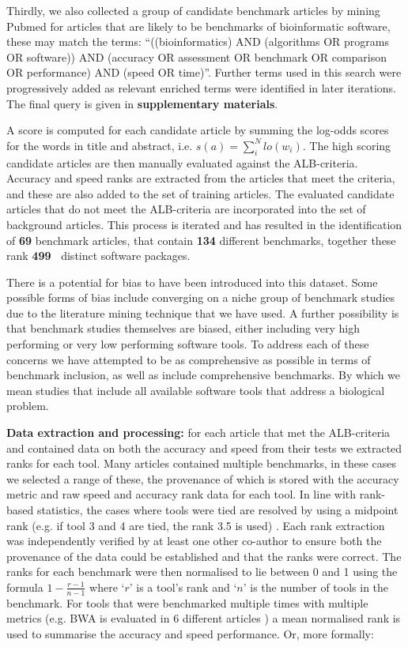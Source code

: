 \documentclass[fleqn,10pt]{SelfArx} %
\def\numTools{499}
\def\numBenchmarkPubs{69}
\def\numBenchmarks{134}
\begin{document}
Thirdly, we also collected a group of candidate benchmark articles by
mining Pubmed for articles that are likely to be benchmarks of
bioinformatic software, these may match the terms: “((bioinformatics)
AND (algorithms OR programs OR software)) AND (accuracy OR assessment
OR benchmark OR comparison OR performance) AND (speed OR
time)”. Further terms used in this search were progressively added as
relevant enriched terms were identified in later iterations. The final
query is given in \textbf{supplementary materials}.

A score is computed for each candidate article by summing the log-odds
scores for the words in title and abstract,
i.e. $s(a)=\sum_i^Nlo(w_i)$. The high scoring candidate articles are
then manually evaluated against the ALB-criteria. Accuracy and speed
ranks are extracted from the articles that meet the criteria, and
these are also added to the set of training articles. The evaluated
candidate articles that do not meet the ALB-criteria are incorporated
into the set of background articles. This process is iterated and has resulted in the identification of
\textbf{{\color{red}\numBenchmarkPubs}} benchmark articles, that
contain \textbf{{\color{red}\numBenchmarks}} different benchmarks, together these
rank \textbf{{\color{red}\numTools~}} distinct software packages.

There is a potential for bias to have been introduced into this
dataset. Some possible forms of bias include converging on a niche
group of benchmark studies due to the literature mining technique that
we have used. A further possibility is that benchmark studies
themselves are biased, either including very high performing or very
low performing software tools. To address each of these concerns we
have attempted to be as comprehensive as possible in terms of
benchmark inclusion, as well as include comprehensive benchmarks. By
which we mean studies that include all available software tools that
address a biological problem.

\textbf{Data extraction and processing:} for each article that met the
ALB-criteria and contained data on both the accuracy and speed from
their tests we extracted ranks for each tool. Many articles contained
multiple benchmarks, in these cases we selected a range of these, the
provenance of which is stored with the accuracy metric and raw speed
and accuracy rank data for each tool. In line with rank-based
statistics, the cases where tools were tied are resolved by using a
midpoint rank (e.g. if tool 3 and 4 are tied, the rank 3.5 is used)
\cite{Mann1947-re}. Each rank extraction was independently verified by
at least one other co-author to ensure both the provenance of the data
could be established and that the ranks were correct. The ranks for
each benchmark were then normalised to lie between 0 and 1 using the
formula $1-\frac{r-1}{n-1}$ where ‘$r$’ is a tool’s rank and ‘$n$’ is the
number of tools in the benchmark. For tools that were benchmarked
multiple times with multiple metrics (e.g. BWA is evaluated in 6
different articles
\cite{Bao2011-lv,Caboche2014-lj,Hatem2013-cs,Schbath2012-ob,Ruffalo2011-rl,Holtgrewe2011-fd})
a mean normalised rank is used to summarise the accuracy and speed performance. 
Or, more formally:
 
\end{document}
